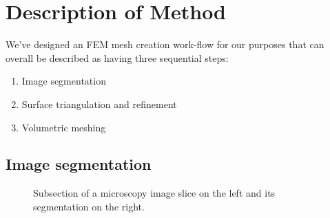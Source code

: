 \documentclass[a4paper,10pt]{article}
\begin{document}
\section{Description of Method}

We've designed an FEM mesh creation work-flow for our purposes that can overall be described as having three sequential steps:
\begin{enumerate}
\item Image segmentation
\item Surface triangulation and refinement
\item Volumetric meshing
\end{enumerate}

\subsection{Image segmentation}

\begin{figure}[H]
\begin{center}
\hspace{0.5cm}
\end{center}
\caption{Subsection of a microscopy image slice on the left and its segmentation on the right.}
\label{fig:slice}
\end{figure}
\end{document}

